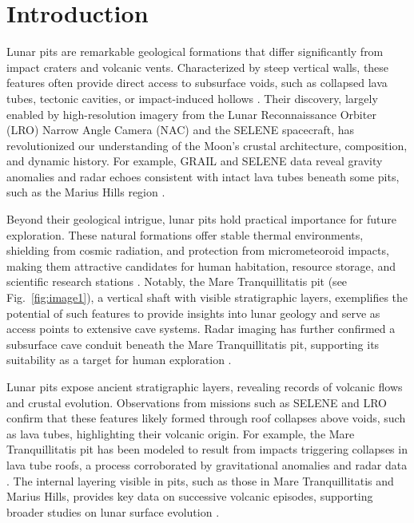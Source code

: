 \graphicspath{{img/ch1}}

\section{Introduction}
Lunar pits are remarkable geological formations that differ significantly from impact craters and volcanic vents. Characterized by steep vertical walls, these features often provide direct access to subsurface voids, such as collapsed lava tubes, tectonic cavities, or impact-induced hollows \cite{lunar-pit-distribution, lunar-pits-entrances-to-caves, new-wagner}. Their discovery, largely enabled by high-resolution imagery from the Lunar Reconnaissance Orbiter (LRO) Narrow Angle Camera (NAC) and the SELENE spacecraft, has revolutionized our understanding of the Moon's crustal architecture, composition, and dynamic history. For example, GRAIL and SELENE data reveal gravity anomalies and radar echoes consistent with intact lava tubes beneath some pits, such as the Marius Hills region \cite{GRAIL, cavities-selene-lavatubes, grails-gradients-mariushills}.

Beyond their geological intrigue, lunar pits hold practical importance for future exploration. These natural formations offer stable thermal environments, shielding from cosmic radiation, and protection from micrometeoroid impacts, making them attractive candidates for human habitation, resource storage, and scientific research stations \cite{bases-feng, newer-thermal, radar-observations-lava-tubes}. Notably, the Mare Tranquillitatis pit (see Fig.~\ref{fig:image1}), a vertical shaft with visible stratigraphic layers, exemplifies the potential of such features to provide insights into lunar geology and serve as access points to extensive cave systems. Radar imaging has further confirmed a subsurface cave conduit beneath the Mare Tranquillitatis pit, supporting its suitability as a target for human exploration \cite{Carrer2024, grails-gradients-mariushills}.

Lunar pits expose ancient stratigraphic layers, revealing records of volcanic flows and crustal evolution. Observations from missions such as SELENE and LRO confirm that these features likely formed through roof collapses above voids, such as lava tubes, highlighting their volcanic origin. For example, the Mare Tranquillitatis pit has been modeled to result from impacts triggering collapses in lava tube roofs, a process corroborated by gravitational anomalies and radar data \cite{lunar-pits-numerical-modelling, radar-observations-lava-tubes, cavities-selene-lavatubes}. The internal layering visible in pits, such as those in Mare Tranquillitatis and Marius Hills, provides key data on successive volcanic episodes, supporting broader studies on lunar surface evolution \cite{sublunear-lava, newer-thermal, bases-feng}.

